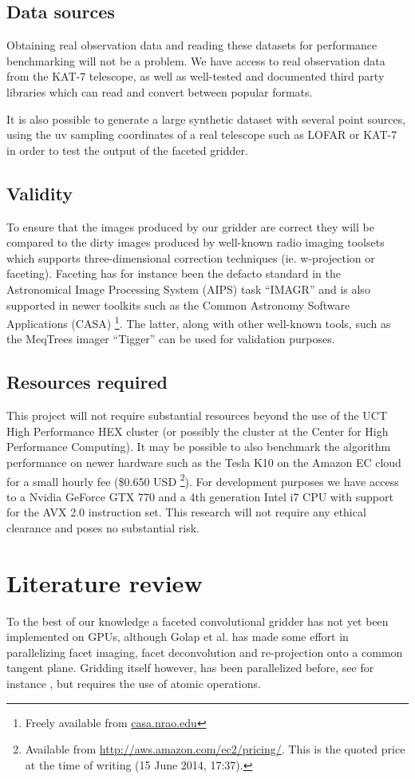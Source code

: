 \documentclass[a4paper, two column]{article}
\begin{document}
\subsection{Data sources}
Obtaining real observation data and reading these datasets for performance benchmarking will not be a problem. We have access to real observation data 
from the KAT-7 telescope, as well as well-tested and documented third party libraries which can read and convert between popular formats. 

It is also possible to generate a large synthetic dataset with several point sources, using the uv sampling coordinates of a real telescope such as LOFAR or KAT-7 in order to 
test the output of the faceted gridder.

\subsection{Validity}
To ensure that the images produced by our gridder are correct they will be compared to the dirty images produced by well-known radio imaging toolsets which supports three-dimensional correction techniques (ie. w-projection or faceting). Faceting has
for instance been the defacto standard in the Astronomical Image Processing System (AIPS) task ``IMAGR'' \cite{AIPS113} and is also supported in newer toolkits such as the Common Astronomy Software Applications (CASA) \footnote{Freely available from \url{casa.nrao.edu}}. 
The latter, along with other well-known tools, such as the MeqTrees imager ``Tigger'' can be used for validation purposes.

\subsection{Resources required} 
This project will not require substantial resources beyond the use of the UCT High Performance HEX cluster (or possibly the cluster at the Center for High Performance Computing). It may be possible to also benchmark the algorithm performance
on newer hardware such as the Tesla K10 on the Amazon EC cloud for a small hourly fee (\$0.650 USD \footnote{Available from \url{http://aws.amazon.com/ec2/pricing/}. This is the quoted price at the time of writing (15 June 2014, 17:37).}). For development purposes we have 
access to a Nvidia GeForce GTX 770 and a 4th generation Intel i7 CPU with support for the AVX 2.0 instruction set. This research will not require any ethical clearance and poses no substantial risk.

\section{Literature review}
To the best of our knowledge a faceted convolutional gridder has not yet been implemented on GPUs, although Golap et al. \cite{golap2001parallelization} has 
made some effort in parallelizing facet imaging, facet deconvolution and re-projection onto a common tangent plane. Gridding itself however, has been parallelized 
before, see for instance \cite{varbanescu2008performance,romein2012efficient,muscat2014high}, but requires the use of atomic operations.
 
\end{document}

